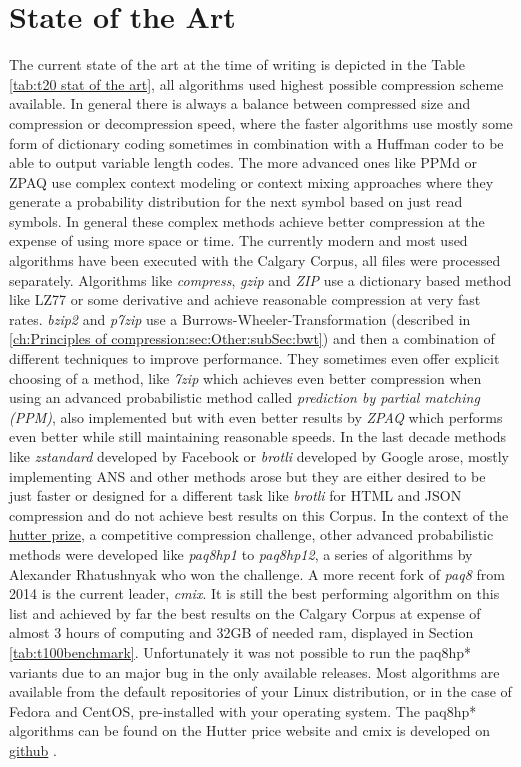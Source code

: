 \section{State of the Art}
\label{ch:Principles of compression:sec:SOTA}
\par{
The current state of the art at the time of writing is depicted in the Table \ref{tab:t20 stat of the art}, all algorithms used highest possible compression scheme available. In general there is always a balance between compressed size and compression or decompression speed, where the faster algorithms use mostly some form of dictionary coding sometimes in combination with a Huffman coder to be able to output variable length codes. The more advanced ones like PPMd or ZPAQ use complex context modeling or context mixing approaches where they generate a probability distribution for the next symbol based on just read symbols. In general these complex methods achieve better compression at the expense of using more space or time. The currently modern and most used algorithms have been executed with the Calgary Corpus, all files were processed separately. Algorithms like \emph{compress}, \emph{gzip} and \emph{ZIP} use a dictionary based method like LZ77 or some derivative and achieve reasonable compression at very fast rates. \emph{bzip2} and \emph{p7zip} use a Burrows-Wheeler-Transformation (described in \ref{ch:Principles of compression:sec:Other:subSec:bwt}) and then a combination of different techniques to improve performance. They sometimes even offer explicit choosing of a method, like \emph{7zip} which achieves even better compression when using an advanced probabilistic method called \emph{prediction by partial matching (PPM)}, also implemented but with even better results by \emph{ZPAQ} which performs even better while still maintaining reasonable speeds. In the last decade methods like \emph{zstandard} developed by Facebook or \emph{brotli} developed by Google arose, mostly implementing ANS and other methods arose but they are either desired to be just faster or designed for a different task like \emph{brotli} for HTML and JSON compression and do not achieve best results on this Corpus. In the context of the \href{http://prize.hutter1.net/}{hutter prize}, a competitive compression challenge, other advanced probabilistic methods were developed like \emph{paq8hp1} to \emph{paq8hp12}, a series of algorithms by Alexander Rhatushnyak \cite{mahoney2011large} who won the challenge. A more recent fork of \emph{paq8} from 2014 is the current leader, \emph{cmix}. It is still the best performing algorithm on this list and achieved by far the best results on the Calgary Corpus at expense of almost 3 hours of computing and 32GB of needed ram, displayed in Section \ref{tab:t100benchmark}. Unfortunately it was not possible to run the paq8hp* variants due to an major bug in the only available releases. Most algorithms are available from the default repositories of your Linux distribution, or in the case of Fedora and CentOS, pre-installed with your operating system. The paq8hp* algorithms can be found on the Hutter price website and cmix is developed on \href{https://github.com/byronknoll/cmix}{github} \cite{cmix}.
}
